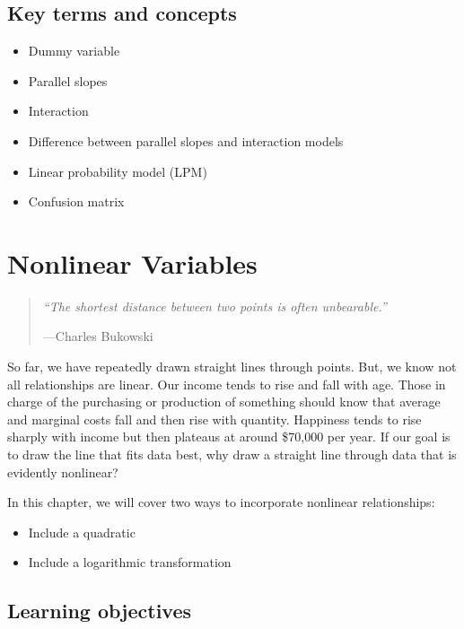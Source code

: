 \documentclass[
]{book}
\providecommand{\tightlist}{%
  \setlength{\itemsep}{0pt}\setlength{\parskip}{0pt}}
\begin{document}
\hypertarget{kt7}{%
\section{Key terms and concepts}\label{kt7}}

\begin{itemize}
\tightlist
\item
  Dummy variable
\item
  Parallel slopes
\item
  Interaction
\item
  Difference between parallel slopes and interaction models
\item
  Linear probability model (LPM)
\item
  Confusion matrix
\end{itemize}

\hypertarget{nonlinear-variables}{%
\chapter{Nonlinear Variables}\label{nonlinear-variables}}

\begin{quote}
\emph{``The shortest distance between two points is often unbearable.''}

---Charles Bukowski
\end{quote}

So far, we have repeatedly drawn straight lines through points. But, we know not all relationships are linear. Our income tends to rise and fall with age. Those in charge of the purchasing or production of something should know that average and marginal costs fall and then rise with quantity. Happiness tends to rise sharply with income but then plateaus at around \$70,000 per year. If our goal is to draw the line that fits data best, why draw a straight line through data that is evidently nonlinear?

In this chapter, we will cover two ways to incorporate nonlinear relationships:

\begin{itemize}
\tightlist
\item
  Include a quadratic
\item
  Include a logarithmic transformation
\end{itemize}

\hypertarget{lo8}{%
\section{Learning objectives}\label{lo8}}
\end{document}
